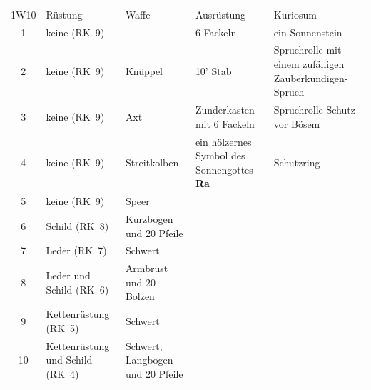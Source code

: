 \documentclass[11pt]{wbzine}
\begin{document}
\begin{tabularx}{\textwidth}{cZZZZ}
    1W10 & Rüstung & Waffe & Ausrüstung & Kuriosum \\
1 &
    keine (RK~9) &
    - &
    6 Fackeln &
    ein Sonnenstein \\

2 &
 keine (RK~9) &
    Knüppel &
    10' Stab &
    Spruchrolle mit einem 
    zufälligen Zauberkundigen-Spruch\\

3 &
 keine (RK~9) &
   Axt &
  Zunderkasten mit 6 Fackeln &
  Spruchrolle Schutz vor Bösem \\

4 &
 keine (RK~9) &
 Streitkolben &
 ein hölzernes Symbol des Sonnengottes \textbf{Ra} &
 Schutzring \\

5 &
 keine (RK~9) &
 Speer &
 &
\\

6 &
 Schild (RK~8) &
 Kurzbogen und 20 Pfeile & 
&
\\

7 &
 Leder (RK~7) &
 Schwert &
&
\\

8 &
 Leder und Schild (RK~6) &
 Armbrust und 20 Bolzen &
 &
\\

9 &
 Kettenrüstung (RK~5) &
 Schwert &
 &
\\

10 &
 Kettenrüstung und Schild (RK~4) &
 Schwert, Langbogen und 20 Pfeile &
 &
\\

\end{tabularx}
\end{document}
